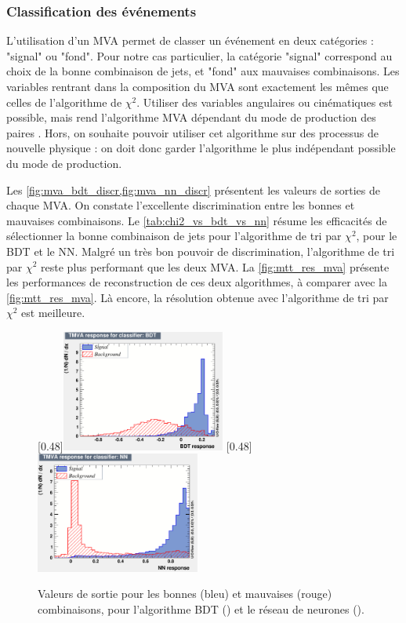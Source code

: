 \subsubsection{Classification des événements \ttbar}

L'utilisation d'un MVA permet de classer un événement en deux catégories : "signal" ou "fond". Pour notre cas particulier, la catégorie "signal" correspond au choix de la bonne combinaison de jets, et "fond" aux mauvaises combinaisons. Les variables rentrant dans la composition du MVA sont exactement les mêmes que celles de l'algorithme de $\chi^2$. Utiliser des variables angulaires ou cinématiques est possible, mais rend l'algorithme MVA dépendant du mode de production des paires \ttbar. Hors, on souhaite pouvoir utiliser cet algorithme sur des processus de nouvelle physique : on doit donc garder l'algorithme le plus indépendant possible du mode de production.

\bigskip

Les \cref{fig:mva_bdt_discr,fig:mva_nn_discr} présentent les valeurs de sorties de chaque MVA. On constate l'excellente discrimination entre les bonnes et mauvaises combinaisons. Le \cref{tab:chi2_vs_bdt_vs_nn} résume les efficacités de sélectionner la bonne combinaison de jets pour l'algorithme de tri par $\chi^2$, pour le BDT et le NN. Malgré un très bon pouvoir de discrimination, l'algorithme de tri par $\chi^2$ reste plus performant que les deux MVA. La \cref{fig:mtt_res_mva} présente les performances de reconstruction de ces deux algorithmes, à comparer avec la \cref{fig:mtt_res_mva}. Là encore, la résolution obtenue avec l'algorithme de tri par $\chi^2$ est meilleure.

\begin{figure}[tbp] \centering
    \subcaptionbox{\label{fig:mva_bdt_discr}}[0.48\textwidth]{\includegraphics[width=0.48\textwidth]{chapitre6/figs/mva/mva_BDT.pdf}}
    \subcaptionbox{\label{fig:mva_nn_discr}}[0.48\textwidth]{\includegraphics[width=0.48\textwidth]{chapitre6/figs/mva/mva_NN.pdf}}
    \caption{Valeurs de sortie pour les bonnes (bleu) et mauvaises (rouge) combinaisons, pour l'algorithme BDT () et le réseau de neurones ().}
\end{figure}

